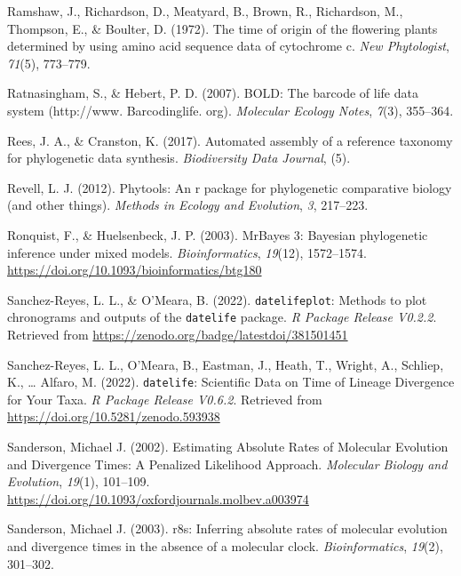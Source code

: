 \documentclass[
  english,
  man]{apa6}
\newlength{\cslhangindent}
\newlength{\cslentryspacingunit} %
\newenvironment{CSLReferences}[2] %
 {%
  \setlength{\parindent}{0pt}
  \ifodd #1
  \let\oldpar\par
  \def\par{\hangindent=\cslhangindent\oldpar}
  \fi
  \setlength{\parskip}{#2\cslentryspacingunit}
 }%
 {}
\begin{document}
\begin{CSLReferences}{1}{0}
\leavevmode{}%
Ramshaw, J., Richardson, D., Meatyard, B., Brown, R., Richardson, M., Thompson, E., \& Boulter, D. (1972). The time of origin of the flowering plants determined by using amino acid sequence data of cytochrome c. \emph{New Phytologist}, \emph{71}(5), 773--779.

\leavevmode{}%
Ratnasingham, S., \& Hebert, P. D. (2007). BOLD: The barcode of life data system (http://www. Barcodinglife. org). \emph{Molecular Ecology Notes}, \emph{7}(3), 355--364.

\leavevmode{}%
Rees, J. A., \& Cranston, K. (2017). Automated assembly of a reference taxonomy for phylogenetic data synthesis. \emph{Biodiversity Data Journal}, (5).

\leavevmode{}%
Revell, L. J. (2012). Phytools: An r package for phylogenetic comparative biology (and other things). \emph{{Methods in Ecology and Evolution}}, \emph{3}, 217--223.

\leavevmode{}%
Ronquist, F., \& Huelsenbeck, J. P. (2003). {MrBayes 3: Bayesian phylogenetic inference under mixed models}. \emph{Bioinformatics}, \emph{19}(12), 1572--1574. \url{https://doi.org/10.1093/bioinformatics/btg180}

\leavevmode{}%
Sanchez-Reyes, L. L., \& O'Meara, B. (2022). {\texttt{datelifeplot}: Methods to plot chronograms and outputs of the \texttt{datelife} package}. \emph{R Package Release V0.2.2}. Retrieved from \url{https://zenodo.org/badge/latestdoi/381501451}

\leavevmode{}%
Sanchez-Reyes, L. L., O'Meara, B., Eastman, J., Heath, T., Wright, A., Schliep, K., \ldots{} Alfaro, M. (2022). {\texttt{datelife}: Scientific Data on Time of Lineage Divergence for Your Taxa}. \emph{R Package Release V0.6.2}. Retrieved from \url{https://doi.org/10.5281/zenodo.593938}

\leavevmode{}%
Sanderson, Michael J. (2002). {Estimating Absolute Rates of Molecular Evolution and Divergence Times: A Penalized Likelihood Approach}. \emph{Molecular Biology and Evolution}, \emph{19}(1), 101--109. \url{https://doi.org/10.1093/oxfordjournals.molbev.a003974}

\leavevmode{}%
Sanderson, Michael J. (2003). r8s: Inferring absolute rates of molecular evolution and divergence times in the absence of a molecular clock. \emph{Bioinformatics}, \emph{19}(2), 301--302.


\end{CSLReferences}
\end{document}

